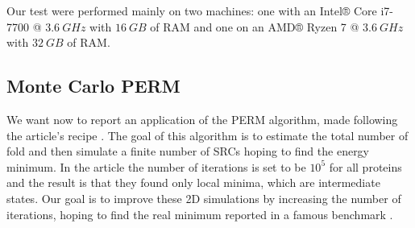 Our test were performed mainly on two machines: one with an Intel® Core i7-7700 @ $3.6 \ GHz$ with $16 \ GB$ of RAM and one on an AMD® Ryzen 7 @ $3.6 \ GHz$ with $32 \ GB$ of RAM.
\subsection{Monte Carlo PERM}
We want now to report an application of the PERM algorithm, made following the article's recipe \cite{PERM}.
The goal of this algorithm is to estimate the total number of fold and then simulate a finite number of SRCs hoping to find the energy minimum.
In the article the number of iterations is set to be $10^5$ for all proteins and the result is that they found only local minima, which are intermediate states.
Our goal is to improve these 2D simulations by increasing the number of iterations, hoping to find the real minimum reported in a famous benchmark \cite{bench}.

